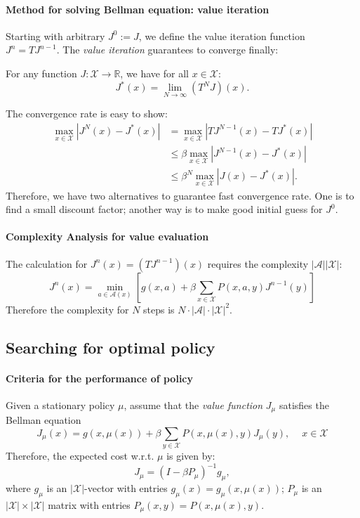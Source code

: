 \paragraph{Method for solving Bellman equation: value iteration}
Starting with arbitrary $J^0:=J$, we define the value iteration function $J^n=TJ^{n-1}$. The \emph{value iteration} guarantees to converge finally: 
\begin{theorem}
For any function $J:\mathcal{X}\to\mathbb{R}$, we have for all $x\in\mathcal{X}$:
\[
J^*(x)=\lim_{N\to\infty}(T^NJ)(x).
\]
\end{theorem}
The convergence rate is easy to show:
\begin{align*}
\max_{x\in\mathcal{X}}|J^N(x)-J^*(x)| & =\max_{x\in\mathcal{X}}|TJ^{N-1}(x)-TJ^*(x)|\\
&\le \beta\max_{x\in\mathcal{X}}|J^{N-1}(x)-J^*(x)|\\&\le \beta^N\max_{x\in\mathcal{X}}|J(x)-J^*(x)|.
\end{align*}
Therefore, we have two alternatives to guarantee fast convergence rate. One is to find a small discount factor; another way is to make good initial guess for $J^0$. 


\paragraph{Complexity Analysis for value evaluation}
The calculation for $J^n(x)=(TJ^{n-1})(x)$ requires the complexity $|\mathcal{A}||\mathcal{X}|$:
\[
J^n(x)=\min_{a\in\mathcal{A}(x)}\left[
g(x,a)+\beta\sum_{x\in\mathcal{X}}P(x,a,y)J^{n-1}(y)
\right]
\]
Therefore the complexity for $N$ steps is $N\cdot |\mathcal{A}|\cdot |\mathcal{X}|^2$.

\subsection{Searching for optimal policy}
\paragraph{Criteria for the performance of policy}
Given a stationary policy $\mu$, assume that the \emph{value function} $J_\mu$ satisfies the Bellman equation
\begin{equation}\label{Eq:1:10}
J_\mu(x)=g(x,\mu(x))+\beta\sum_{y\in\mathcal{X}}P(x,\mu(x),y)J_\mu(y),\ \quad x\in\mathcal{X}
\end{equation}
Therefore, the expected cost w.r.t. $\mu$ is given by:
\begin{equation}\label{Eq:1:11}
J_\mu = (I-\beta P_\mu)^{-1}g_\mu,
\end{equation}
where $g_\mu$ is an $|\mathcal{X}|$-vector with entries $g_\mu(x) = g_\mu(x,\mu(x))$; $P_\mu$ is an $|\mathcal{X}|\times|\mathcal{X}|$ matrix with entries $P_\mu(x,y)=P(x,\mu(x),y)$.

